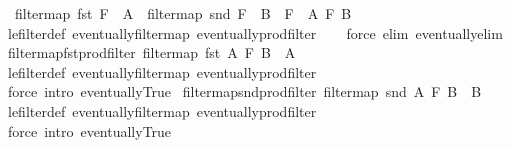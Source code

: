\begin{isabellebody}
\ \ {\isachardoublequoteopen}filtermap\ fst\ F\ {\isasymle}\ A\ {\isasymLongrightarrow}\ filtermap\ snd\ F\ {\isasymle}\ B\ {\isasymLongrightarrow}\ F\ {\isasymle}\ A\ {\isasymtimes}\isactrlsub F\ B{\isachardoublequoteclose}\isanewline
%
\isadelimproof
\ \ %
\endisadelimproof
%
\isatagproof
{}\isamarkupfalse%
\ le{\isacharunderscore}{\kern0pt}filter{\isacharunderscore}{\kern0pt}def\ eventually{\isacharunderscore}{\kern0pt}filtermap\ eventually{\isacharunderscore}{\kern0pt}prod{\isacharunderscore}{\kern0pt}filter\isanewline
\ \ \isamarkupfalse%
\ {\isacharparenleft}{\kern0pt}force\ elim{\isacharcolon}{\kern0pt}\ eventually{\isacharunderscore}{\kern0pt}elim{}{\isacharparenright}{\kern0pt}%
\endisatagproof
{\isafoldproof}%
%
\isadelimproof
\isanewline
%
\endisadelimproof
\isanewline
{}\isamarkupfalse%
\ filtermap{\isacharunderscore}{\kern0pt}fst{\isacharunderscore}{\kern0pt}prod{\isacharunderscore}{\kern0pt}filter{\isacharcolon}{\kern0pt}\ {\isachardoublequoteopen}filtermap\ fst\ {\isacharparenleft}{\kern0pt}A\ {\isasymtimes}\isactrlsub F\ B{\isacharparenright}{\kern0pt}\ {\isasymle}\ A{\isachardoublequoteclose}\isanewline
%
\isadelimproof
\ \ %
\endisadelimproof
%
\isatagproof
{}\isamarkupfalse%
\ le{\isacharunderscore}{\kern0pt}filter{\isacharunderscore}{\kern0pt}def\ eventually{\isacharunderscore}{\kern0pt}filtermap\ eventually{\isacharunderscore}{\kern0pt}prod{\isacharunderscore}{\kern0pt}filter\isanewline
\ \ \isamarkupfalse%
\ {\isacharparenleft}{\kern0pt}force\ intro{\isacharcolon}{\kern0pt}\ eventually{\isacharunderscore}{\kern0pt}True{\isacharparenright}{\kern0pt}%
\endisatagproof
{\isafoldproof}%
%
\isadelimproof
\isanewline
%
\endisadelimproof
\isanewline
{}\isamarkupfalse%
\ filtermap{\isacharunderscore}{\kern0pt}snd{\isacharunderscore}{\kern0pt}prod{\isacharunderscore}{\kern0pt}filter{\isacharcolon}{\kern0pt}\ {\isachardoublequoteopen}filtermap\ snd\ {\isacharparenleft}{\kern0pt}A\ {\isasymtimes}\isactrlsub F\ B{\isacharparenright}{\kern0pt}\ {\isasymle}\ B{\isachardoublequoteclose}\isanewline
%
\isadelimproof
\ \ %
\endisadelimproof
%
\isatagproof
{}\isamarkupfalse%
\ le{\isacharunderscore}{\kern0pt}filter{\isacharunderscore}{\kern0pt}def\ eventually{\isacharunderscore}{\kern0pt}filtermap\ eventually{\isacharunderscore}{\kern0pt}prod{\isacharunderscore}{\kern0pt}filter\isanewline
\ \ \isamarkupfalse%
\ {\isacharparenleft}{\kern0pt}force\ intro{\isacharcolon}{\kern0pt}\ eventually{\isacharunderscore}{\kern0pt}True{\isacharparenright}{\kern0pt}%

\end{isabellebody}
